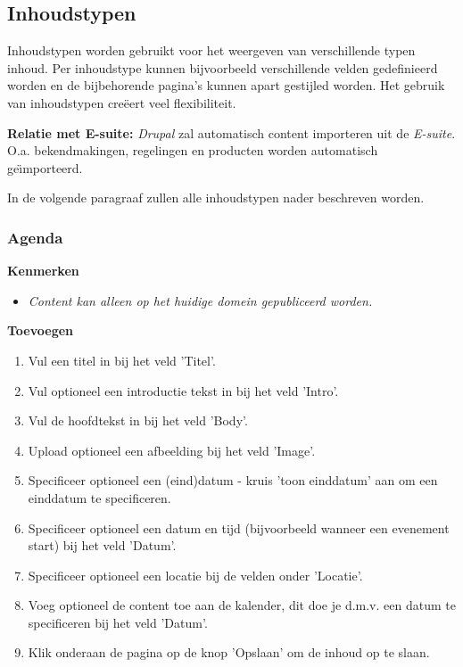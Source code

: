 \subsection{Inhoudstypen}\label{inhoudstypen}
Inhoudstypen worden gebruikt voor het weergeven van verschillende typen inhoud. Per inhoudstype kunnen bijvoorbeeld verschillende velden gedefinieerd worden en de bijbehorende pagina's kunnen apart gestijled worden. Het gebruik van inhoudstypen cre{\"{e}}ert veel flexibiliteit.

\textbf{Relatie met E-suite:}  \emph{Drupal} zal automatisch content importeren uit de \emph{E-suite}. O.a. bekendmakingen, regelingen en producten worden automatisch ge{\"\i}mporteerd. 

In de volgende paragraaf zullen alle inhoudstypen nader beschreven worden.

\subsubsection{Agenda}\label{agenda}

\textbf{Kenmerken}

\begin{itemize}
\item \emph{Content kan alleen op het huidige domein gepubliceerd worden.}
\end{itemize}

\textbf{Toevoegen}

\begin{enumerate}
\item Vul een titel in bij het veld 'Titel'.
\item Vul optioneel een introductie tekst in bij het veld 'Intro'.
\item Vul de hoofdtekst in bij het veld 'Body'.
\item Upload optioneel een afbeelding bij het veld 'Image'.
\item Specificeer optioneel een (eind)datum - kruis 'toon einddatum' aan om een einddatum te specificeren.
\item Specificeer optioneel een datum en tijd (bijvoorbeeld wanneer een evenement start) bij het veld 'Datum'.
\item Specificeer optioneel een locatie bij de velden onder 'Locatie'.
\item Voeg optioneel de content toe aan de kalender, dit doe je d.m.v. een datum te specificeren bij het veld 'Datum'.
\item Klik onderaan de pagina op de knop 'Opslaan' om de inhoud op te slaan.
\end{enumerate}

